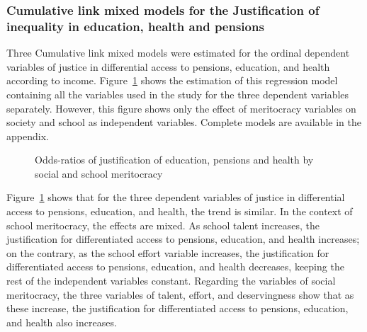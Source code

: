 \documentclass[
  letterpaper,
  DIV=11,
  numbers=noendperiod]{scrartcl}
\begin{document}
\subsubsection{Cumulative link mixed models for the Justification of
inequality in education, health and
pensions}\label{cumulative-link-mixed-models-for-the-justification-of-inequality-in-education-health-and-pensions}

Three Cumulative link mixed models were estimated for the ordinal
dependent variables of justice in differential access to pensions,
education, and health according to income. Figure~\ref{fig-odds} shows
the estimation of this regression model containing all the variables
used in the study for the three dependent variables separately. However,
this figure shows only the effect of meritocracy variables on society
and school as independent variables. Complete models are available in
the appendix.

\begin{figure}


\caption{\label{fig-odds}Odds-ratios of justification of education,
pensions and health by social and school meritocracy}

\end{figure}%

Figure~\ref{fig-odds} shows that for the three dependent variables of
justice in differential access to pensions, education, and health, the
trend is similar. In the context of school meritocracy, the effects are
mixed. As school talent increases, the justification for differentiated
access to pensions, education, and health increases; on the contrary, as
the school effort variable increases, the justification for
differentiated access to pensions, education, and health decreases,
keeping the rest of the independent variables constant. Regarding the
variables of social meritocracy, the three variables of talent, effort,
and deservingness show that as these increase, the justification for
differentiated access to pensions, education, and health also increases.
\end{document}
